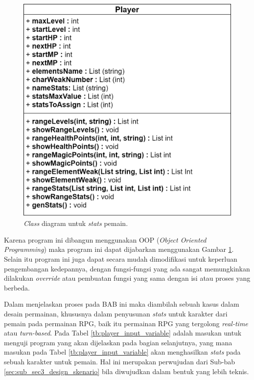 \begin{figure} [!h] \centering
	\includegraphics[scale=0.25]{img/player_uml.png}
	\caption{\textit{Class} diagram untuk \textit{stats} pemain.}
	\label{fig:player_uml}
\end{figure}

Karena program ini dibangun menggunakan OOP (\textit{Object Oriented Programming}) maka program ini dapat dijabarkan menggunakan Gambar \ref{fig:player_uml}. Selain itu program ini juga dapat secara mudah dimodifikasi untuk keperluan pengembangan kedepannya, dengan fungsi-fungsi yang ada sangat memungkinkan dilakukan \textit{override} atau pembuatan fungsi yang sama dengan isi atau proses yang berbeda.
\vspace{1ex}

Dalam menjelaskan proses pada BAB ini maka diambilah sebuah kasus dalam desain permainan, khususnya dalam penyusunan \textit{stats} untuk karakter dari pemain pada permainan RPG, baik itu permainan RPG yang tergolong \textit{real-time} atau \textit{turn-based}. Pada Tabel \ref{tb:player_input_variable} adalah masukan untuk menguji program yang akan dijelaskan pada bagian selanjutnya, yang mana masukan pada Tabel \ref{tb:player_input_variable} akan menghasilkan \textit{stats} pada sebuah karakter untuk pemain. Hal ini merupakan perwujudan dari Sub-bab \ref{sec:sub_sec3_design_skenario} bila diwujudkan dalam bentuk yang lebih teknis.
\vspace{-1ex}


